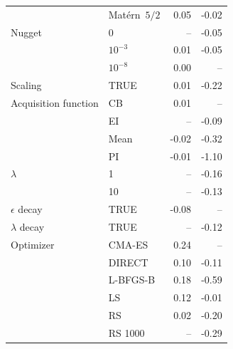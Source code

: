 \begin{table}[H]
\begin{tabular}{llrr}
                         & Matérn~$5/2$  & 0.05           & -0.02          \\
    Nugget               & 0           & --             & -0.05          \\
                         & $10^{-3}$        & 0.01           & -0.05          \\
                         & $10^{-8}$        & 0.00           & --             \\
    Scaling              & TRUE        & 0.01           & -0.22          \\
    Acquisition function & CB          & 0.01           & --             \\
                         & EI          & --             & -0.09          \\
                         & Mean        & -0.02          & -0.32          \\
                         & PI          & -0.01          & -1.10          \\
    $\lambda$            & 1           & --             & -0.16          \\
                         & 10          & --             & -0.13          \\
    $\epsilon$ decay     & TRUE        & -0.08          & --             \\
    $\lambda$ decay      & TRUE        & --             & -0.12          \\
    Optimizer            & CMA-ES      & 0.24           & --             \\
                         & DIRECT      & 0.10           & -0.11          \\
                         & L-BFGS-B    & 0.18           & -0.59          \\
                         & LS          & 0.12           & -0.01          \\
                         & RS          & 0.02           & -0.20          \\
                         & RS 1000     & --             & -0.29          \\
    \bottomrule
  \end{tabular}
\end{table}